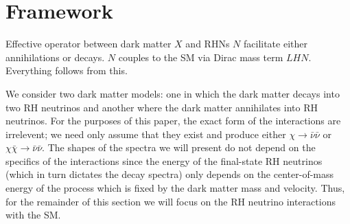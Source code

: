 \documentclass[a4paper,11pt]{article} \pdfoutput=1
\newcommand{\rhn}{\bar{\nu}}
\begin{document}
\section{Framework}
\label{sec:framework}

Effective operator between dark matter $X$ and RHNs $N$ facilitate either
annihilations or decays. $N$ couples to the SM via Dirac mass term $LHN$.
Everything follows from this.

We consider two dark matter models: one in which the dark matter decays into
two RH neutrinos and another where the dark matter annihilates into RH
neutrinos. For the purposes of this paper, the exact form of the interactions
are irrelevent; we need only assume that they exist and produce either \(\chi
\to \rhn\rhn\) or \(\chi\bar{\chi} \to \rhn\rhn\). The shapes of the spectra we
will present do not depend on the specifics of the interactions since the
energy of the final-state RH neutrinos (which in turn dictates the decay
spectra) only depends on the center-of-mass energy of the process which is
fixed by the dark matter mass and velocity. Thus, for the remainder of this section
we will focus on the RH neutrino interactions with the SM.
\end{document}
